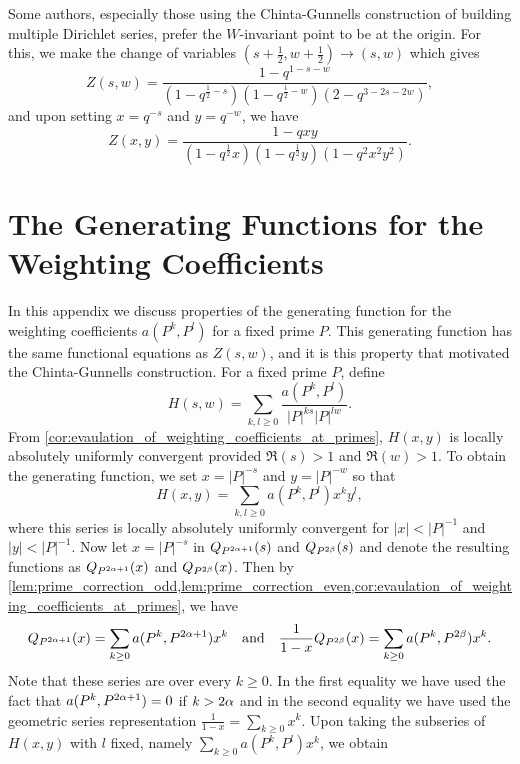 \documentclass[12pt,reqno,oneside]{amsart}
\begin{document}
    \begin{remark}
        Some authors, especially those using the Chinta-Gunnells construction of building multiple Dirichlet series, prefer the $W$-invariant point to be at the origin. For this, we make the change of variables $\left(s+\frac{1}{2},w+\frac{1}{2}\right) \to (s,w)$ which gives
        \[
            Z(s,w) = \frac{1-q^{1-s-w}}{(1-q^{\frac{1}{2}-s})(1-q^{\frac{1}{2}-w})(2-q^{3-2s-2w})},
        \]
         and upon setting $x = q^{-s}$ and $y = q^{-w}$, we have
        \[
            Z(x,y) = \frac{1-qxy}{(1-q^{\frac{1}{2}}x)(1-q^{\frac{1}{2}}y)(1-q^{2}x^{2}y^{2})}.
        \]
    \end{remark}

\appendix
\section*{The Generating Functions for the Weighting Coefficients}
    In this appendix we discuss properties of the generating function for the weighting coefficients $a(P^{k},P^{l})$ for a fixed prime $P$. This generating function has the same functional equations as $Z(s,w)$, and it is this property that motivated the Chinta-Gunnells construction. For a fixed prime $P$, define
    \[
        H(s,w) = \sum_{k,l \ge 0}\frac{a(P^{k},P^{l})}{|P|^{ks}|P|^{lw}}.
    \]
    From \cref{cor:evaulation_of_weighting_coefficients_at_primes}, $H(x,y)$ is locally absolutely uniformly convergent provided $\Re(s) > 1$ and $\Re(w) > 1$. To obtain the generating function, we set $x = |P|^{-s}$ and $y = |P|^{-w}$ so that
    \[
        H(x,y) = \sum_{k,l \ge 0}a(P^{k},P^{l})x^{k}y^{l},
    \]
    where this series is locally absolutely uniformly convergent for $|x| < |P|^{-1}$ and $|y| < |P|^{-1}$. Now let $x = |P|^{-s}$ in $Q_{P^{2\alpha+1}}(s)$ and $Q_{P^{2\beta}}(s)$ and denote the resulting functions as $Q_{P^{2\alpha+1}}(x)$ and $Q_{P^{2\beta}}(x)$. Then by \cref{lem:prime_correction_odd,lem:prime_correction_even,cor:evaulation_of_weighting_coefficients_at_primes}, we have
    \[
        Q_{P^{2\alpha+1}}(x) = \sum_{k \ge 0}a(P^{k},P^{2\alpha+1})x^{k} \quad \text{and} \quad \frac{1}{1-x}Q_{P^{2\beta}}(x) = \sum_{k \ge 0}a(P^{k},P^{2\beta})x^{k}.
    \]
    Note that these series are over every $k \ge 0$. In the first equality we have used the fact that $a(P^{k},P^{2\alpha+1}) = 0$ if $k > 2\alpha$ and in the second equality we have used the geometric series representation $\frac{1}{1-x} = \sum_{k \ge 0}x^{k}$. Upon taking the subseries of $H(x,y)$ with $l$ fixed, namely $\sum_{k \ge 0}a(P^{k},P^{l})x^{k}$, we obtain
\end{document}
